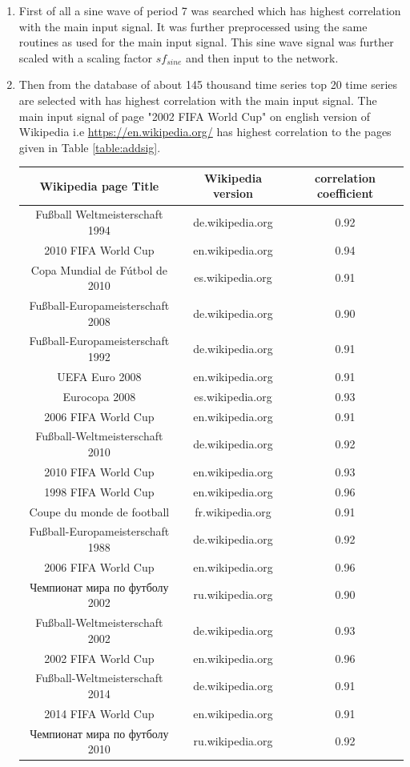  \begin{enumerate}
	 \item First of all a sine wave of period 7 was searched which has highest correlation with the main input signal. It was further preprocessed using the same routines as used for the main input signal. This sine wave signal was further scaled with a scaling factor $sf_{sine}$ and then input to the network.
	 \item Then from the database of about 145 thousand time series top 20 time series are selected with has highest correlation with the main input signal. The main input signal of page "2002 FIFA World Cup" on english version of Wikipedia i.e \url{https://en.wikipedia.org/} has highest correlation to the pages given in Table \ref{table:addsig}. \\
 	\begin{center}
 	 \label{table:addsig} 
 	\begin{tabular}{|c|c|c|} \hline
 		Wikipedia page Title & Wikipedia version & correlation coefficient \\ \hline
		Fußball Weltmeisterschaft 1994 & de.wikipedia.org & 0.92 \\ \hline
		2010 FIFA World Cup & en.wikipedia.org & 0.94 \\ \hline
		Copa Mundial de Fútbol de 2010 & es.wikipedia.org & 0.91 \\ \hline
		Fußball-Europameisterschaft 2008 & de.wikipedia.org & 0.90 \\ \hline
		Fußball-Europameisterschaft 1992 & de.wikipedia.org & 0.91 \\ \hline
		UEFA Euro 2008 & en.wikipedia.org &  0.91 \\ \hline
		Eurocopa 2008 & es.wikipedia.org & 0.93 \\ \hline
		2006 FIFA World Cup & en.wikipedia.org & 0.91 \\ \hline
		Fußball-Weltmeisterschaft 2010 & de.wikipedia.org & 0.92 \\ \hline
		2010 FIFA World Cup & en.wikipedia.org & 0.93 \\ \hline
		1998 FIFA World Cup & en.wikipedia.org &  0.96 \\ \hline
		Coupe du monde  de football   & fr.wikipedia.org & 0.91 \\ \hline
		Fußball-Europameisterschaft 1988 & de.wikipedia.org & 0.92 \\ \hline
		2006  FIFA World Cup & en.wikipedia.org &  0.96 \\ \hline
		Чемпионат мира по футболу 2002 & ru.wikipedia.org & 0.90 \\ \hline
		Fußball-Weltmeisterschaft 2002 & de.wikipedia.org &  0.93 \\ \hline
		2002 FIFA World Cup & en.wikipedia.org & 0.96 \\ \hline
		Fußball-Weltmeisterschaft 2014 & de.wikipedia.org & 0.91 \\ \hline
		2014 FIFA World Cup & en.wikipedia.org & 0.91 \\ \hline
		Чемпионат мира по футболу 2010 & ru.wikipedia.org & 0.92 \\ \hline
		

\end{tabular}
\end{center}
\end{enumerate}
